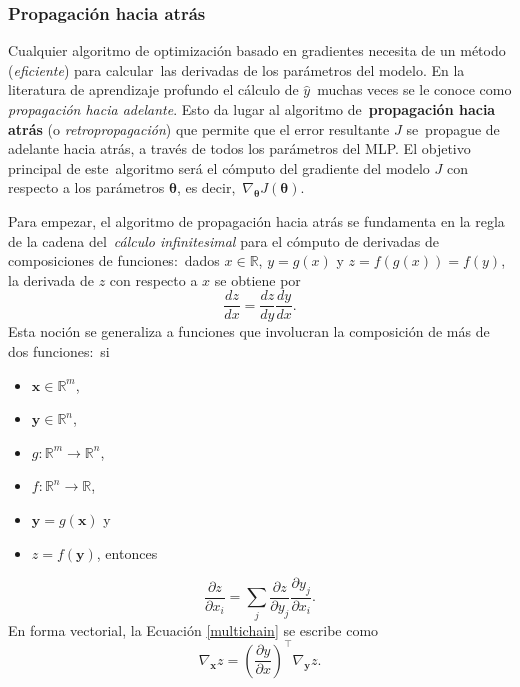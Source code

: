 \subsubsection{Propagación hacia atrás}

\noindent
Cualquier algoritmo de optimización basado en gradientes necesita de un método (\emph{eficiente}) para calcular\
las derivadas de los parámetros del modelo. En la literatura de aprendizaje profundo el cálculo de $\hat{y}$\
muchas veces se le conoce como \emph{propagación hacia adelante}. Esto da lugar al algoritmo de\
\textbf{propagación hacia atrás} (o \emph{retropropagación}) que permite que el error resultante $J$ se\
propague de adelante hacia atrás, a través de todos los parámetros del MLP. El objetivo principal de este\
algoritmo será el cómputo del gradiente del modelo $J$ con respecto a los parámetros $\bm{\theta}$, es decir,\
$\nabla_{\bm{\theta}} J(\bm{\theta})$.\par
Para empezar, el algoritmo de propagación hacia atrás se fundamenta en la regla de la cadena del\
\emph{cálculo infinitesimal} para el cómputo de derivadas de composiciones de funciones:\
dados $x \in \mathbb{R}$, $y = g(x)$ y $z = f(g(x)) = f(y)$, la derivada de $z$ con respecto a $x$ se obtiene por
\begin{equation}
  \frac{dz}{dx} =  \frac{dz}{dy} \frac{dy}{dx}.
\end{equation}
Esta noción se generaliza a funciones que involucran la composición de más de dos funciones:\
si
\begin{itemize}
\item $\mathbf{x} \in \mathbb{R}^m$,
\item $\mathbf{y} \in \mathbb{R}^n$,
\item $g: \mathbb{R}^m \to \mathbb{R}^n$,
\item $f: \mathbb{R}^n \to \mathbb{R}$,
\item $\mathbf{y} = g(\mathbf{x})$ y
\item $z = f(\mathbf{y})$, entonces
\end{itemize}
\begin{equation}
  \frac{\partial z}{\partial x_i} =
  \sum_j \frac{\partial z}{\partial y_j} \frac{\partial y_j}{\partial x_i}. \label{multichain}
\end{equation}
En forma vectorial, la Ecuación \ref{multichain} se escribe como
\begin{equation}
  \nabla_{\mathbf{x}} z =
  \left(\frac{\partial y}{\partial x}\right)^\top \nabla_{\mathbf{y}} z. \label{vectchain}
\end{equation}\par
